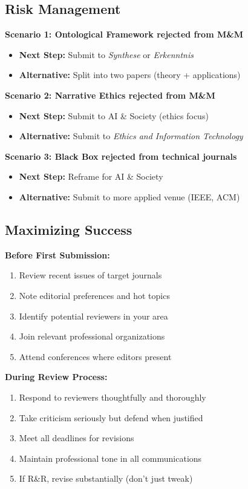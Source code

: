 \documentclass[12pt]{article}
\begin{document}
\subsection{Risk Management}

\textbf{Scenario 1: Ontological Framework rejected from M\&M}
\begin{itemize}[leftmargin=*]
\item \textbf{Next Step:} Submit to \textit{Synthese} or \textit{Erkenntnis}
\item \textbf{Alternative:} Split into two papers (theory + applications)
\end{itemize}

\textbf{Scenario 2: Narrative Ethics rejected from M\&M}
\begin{itemize}[leftmargin=*]
\item \textbf{Next Step:} Submit to AI \& Society (ethics focus)
\item \textbf{Alternative:} Submit to \textit{Ethics and Information Technology}
\end{itemize}

\textbf{Scenario 3: Black Box rejected from technical journals}
\begin{itemize}[leftmargin=*]
\item \textbf{Next Step:} Reframe for AI \& Society
\item \textbf{Alternative:} Submit to more applied venue (IEEE, ACM)
\end{itemize}

\subsection{Maximizing Success}

\textbf{Before First Submission:}
\begin{enumerate}[leftmargin=*]
\item Review recent issues of target journals
\item Note editorial preferences and hot topics
\item Identify potential reviewers in your area
\item Join relevant professional organizations
\item Attend conferences where editors present
\end{enumerate}

\textbf{During Review Process:}
\begin{enumerate}[leftmargin=*]
\item Respond to reviewers thoughtfully and thoroughly
\item Take criticism seriously but defend when justified
\item Meet all deadlines for revisions
\item Maintain professional tone in all communications
\item If R\&R, revise substantially (don't just tweak)
\end{enumerate}
\end{document}
